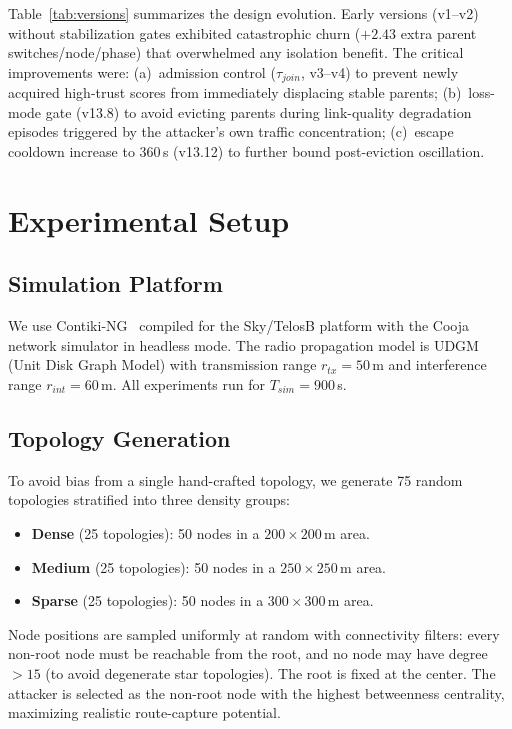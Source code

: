 \documentclass[conference]{IEEEtran}
\begin{document}
Table~\ref{tab:versions} summarizes the design evolution.
Early versions (v1--v2) without stabilization gates exhibited
catastrophic churn ($+2.43$ extra parent switches/node/phase)
that overwhelmed any isolation benefit.
The critical improvements were:
(a)~admission control ($\tau_{join}$, v3--v4) to prevent newly
    acquired high-trust scores from immediately displacing stable parents;
(b)~loss-mode gate (v13.8) to avoid evicting parents during link-quality
    degradation episodes triggered by the attacker's own traffic concentration;
(c)~escape cooldown increase to $360$\,s (v13.12) to further bound
    post-eviction oscillation.

\section{Experimental Setup}
\label{sec:setup}

\subsection{Simulation Platform}
We use Contiki-NG~\cite{contiki-ng} compiled for the Sky/TelosB platform
with the Cooja~\cite{cooja} network simulator in headless mode.
The radio propagation model is UDGM (Unit Disk Graph Model)
with transmission range $r_{tx} = 50$\,m and interference range
$r_{int} = 60$\,m.
All experiments run for $T_{sim} = 900$\,s.

\subsection{Topology Generation}
\label{sec:topos}

To avoid bias from a single hand-crafted topology,
we generate 75 random topologies stratified into three density groups:
\begin{itemize}
  \item \textbf{Dense} (25 topologies): 50 nodes in a $200 \times 200$\,m area.
  \item \textbf{Medium} (25 topologies): 50 nodes in a $250 \times 250$\,m area.
  \item \textbf{Sparse} (25 topologies): 50 nodes in a $300 \times 300$\,m area.
\end{itemize}
Node positions are sampled uniformly at random with connectivity filters:
every non-root node must be reachable from the root,
and no node may have degree $> 15$ (to avoid degenerate star topologies).
The root is fixed at the center.
The attacker is selected as the non-root node with the highest
betweenness centrality, maximizing realistic route-capture potential.
\end{document}
